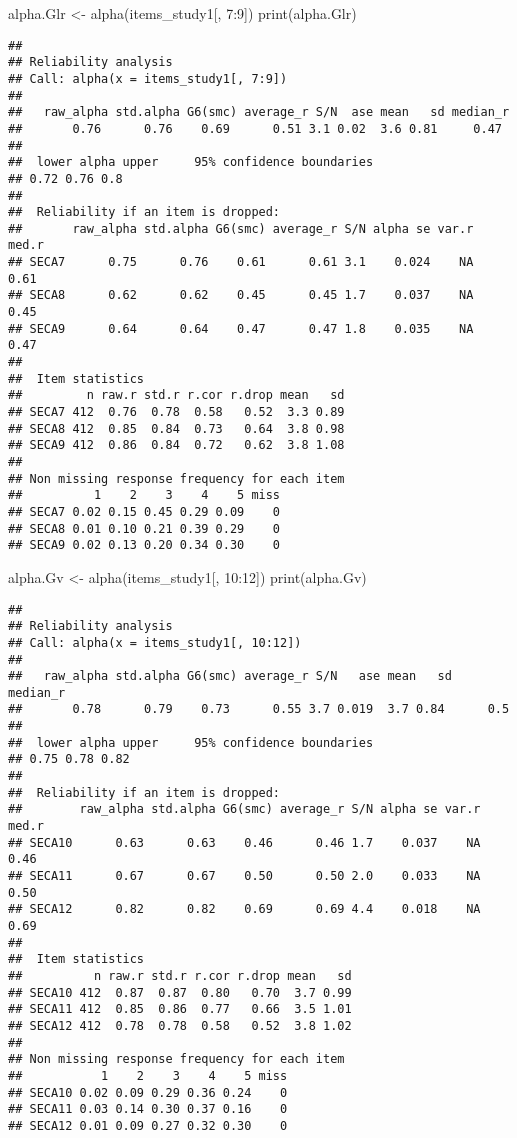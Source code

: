 \documentclass[
]{article}
\newenvironment{Shaded}{\begin{snugshade}}{\end{snugshade}}
\newcommand{\DecValTok}[1]{\textcolor[rgb]{0.00,0.00,0.81}{#1}}
\newcommand{\FunctionTok}[1]{\textcolor[rgb]{0.00,0.00,0.00}{#1}}
\newcommand{\NormalTok}[1]{#1}
\newcommand{\OtherTok}[1]{\textcolor[rgb]{0.56,0.35,0.01}{#1}}
\newcommand{\SpecialCharTok}[1]{\textcolor[rgb]{0.00,0.00,0.00}{#1}}
\begin{document}
\begin{Shaded}
\begin{Highlighting}[]
\NormalTok{alpha.Glr }\OtherTok{\textless{}{-}} \FunctionTok{alpha}\NormalTok{(items\_study1[, }\DecValTok{7}\SpecialCharTok{:}\DecValTok{9}\NormalTok{])}
\FunctionTok{print}\NormalTok{(alpha.Glr)}
\end{Highlighting}
\end{Shaded}

\begin{verbatim}
## 
## Reliability analysis   
## Call: alpha(x = items_study1[, 7:9])
## 
##   raw_alpha std.alpha G6(smc) average_r S/N  ase mean   sd median_r
##       0.76      0.76    0.69      0.51 3.1 0.02  3.6 0.81     0.47
## 
##  lower alpha upper     95% confidence boundaries
## 0.72 0.76 0.8 
## 
##  Reliability if an item is dropped:
##       raw_alpha std.alpha G6(smc) average_r S/N alpha se var.r med.r
## SECA7      0.75      0.76    0.61      0.61 3.1    0.024    NA  0.61
## SECA8      0.62      0.62    0.45      0.45 1.7    0.037    NA  0.45
## SECA9      0.64      0.64    0.47      0.47 1.8    0.035    NA  0.47
## 
##  Item statistics 
##         n raw.r std.r r.cor r.drop mean   sd
## SECA7 412  0.76  0.78  0.58   0.52  3.3 0.89
## SECA8 412  0.85  0.84  0.73   0.64  3.8 0.98
## SECA9 412  0.86  0.84  0.72   0.62  3.8 1.08
## 
## Non missing response frequency for each item
##          1    2    3    4    5 miss
## SECA7 0.02 0.15 0.45 0.29 0.09    0
## SECA8 0.01 0.10 0.21 0.39 0.29    0
## SECA9 0.02 0.13 0.20 0.34 0.30    0
\end{verbatim}

\begin{Shaded}
\begin{Highlighting}[]
\NormalTok{alpha.Gv }\OtherTok{\textless{}{-}} \FunctionTok{alpha}\NormalTok{(items\_study1[, }\DecValTok{10}\SpecialCharTok{:}\DecValTok{12}\NormalTok{])}
\FunctionTok{print}\NormalTok{(alpha.Gv)}
\end{Highlighting}
\end{Shaded}

\begin{verbatim}
## 
## Reliability analysis   
## Call: alpha(x = items_study1[, 10:12])
## 
##   raw_alpha std.alpha G6(smc) average_r S/N   ase mean   sd median_r
##       0.78      0.79    0.73      0.55 3.7 0.019  3.7 0.84      0.5
## 
##  lower alpha upper     95% confidence boundaries
## 0.75 0.78 0.82 
## 
##  Reliability if an item is dropped:
##        raw_alpha std.alpha G6(smc) average_r S/N alpha se var.r med.r
## SECA10      0.63      0.63    0.46      0.46 1.7    0.037    NA  0.46
## SECA11      0.67      0.67    0.50      0.50 2.0    0.033    NA  0.50
## SECA12      0.82      0.82    0.69      0.69 4.4    0.018    NA  0.69
## 
##  Item statistics 
##          n raw.r std.r r.cor r.drop mean   sd
## SECA10 412  0.87  0.87  0.80   0.70  3.7 0.99
## SECA11 412  0.85  0.86  0.77   0.66  3.5 1.01
## SECA12 412  0.78  0.78  0.58   0.52  3.8 1.02
## 
## Non missing response frequency for each item
##           1    2    3    4    5 miss
## SECA10 0.02 0.09 0.29 0.36 0.24    0
## SECA11 0.03 0.14 0.30 0.37 0.16    0
## SECA12 0.01 0.09 0.27 0.32 0.30    0
\end{verbatim}
\end{document}
